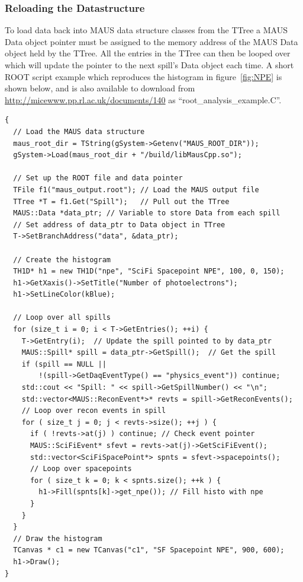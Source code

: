 \documentclass[a4paper,10pt]{article}
\begin{document}
  \subsubsection{Reloading the Datastructure}
  \label{sec:RootAnalysisDatastructure}
  To load data back into MAUS data structure classes from the TTree a MAUS Data object pointer must be assigned to the memory address of the MAUS Data object held by the TTree. All the entries in the TTree can then be looped over which will update the pointer to the next spill's Data object each time.  A short ROOT script example which reproduces the histogram in figure~\ref{fig:NPE} is shown below, and is also available to download from \url{http://micewww.pp.rl.ac.uk/documents/140} as ``root\_analysis\_example.C''.
  \begin{lstlisting}
{
  // Load the MAUS data structure
  maus_root_dir = TString(gSystem->Getenv("MAUS_ROOT_DIR"));
  gSystem->Load(maus_root_dir + "/build/libMausCpp.so");

  // Set up the ROOT file and data pointer
  TFile f1("maus_output.root"); // Load the MAUS output file
  TTree *T = f1.Get("Spill");   // Pull out the TTree
  MAUS::Data *data_ptr; // Variable to store Data from each spill
  // Set address of data_ptr to Data object in TTree
  T->SetBranchAddress("data", &data_ptr);  
  
  // Create the histogram
  TH1D* h1 = new TH1D("npe", "SciFi Spacepoint NPE", 100, 0, 150);
  h1->GetXaxis()->SetTitle("Number of photoelectrons");
  h1->SetLineColor(kBlue);

  // Loop over all spills
  for (size_t i = 0; i < T->GetEntries(); ++i) {
    T->GetEntry(i);  // Update the spill pointed to by data_ptr
    MAUS::Spill* spill = data_ptr->GetSpill();  // Get the spill
    if (spill == NULL ||
        !(spill->GetDaqEventType() == "physics_event")) continue;
    std::cout << "Spill: " << spill->GetSpillNumber() << "\n";
    std::vector<MAUS::ReconEvent*>* revts = spill->GetReconEvents();
    // Loop over recon events in spill
    for ( size_t j = 0; j < revts->size(); ++j ) {
      if ( !revts->at(j) ) continue; // Check event pointer
      MAUS::SciFiEvent* sfevt = revts->at(j)->GetSciFiEvent();
      std::vector<SciFiSpacePoint*> spnts = sfevt->spacepoints();
      // Loop over spacepoints
      for ( size_t k = 0; k < spnts.size(); ++k ) {
        h1->Fill(spnts[k]->get_npe()); // Fill histo with npe
      }
    }
  }
  // Draw the histogram
  TCanvas * c1 = new TCanvas("c1", "SF Spacepoint NPE", 900, 600);
  h1->Draw();
}
  \end{lstlisting}
  
\end{document}
